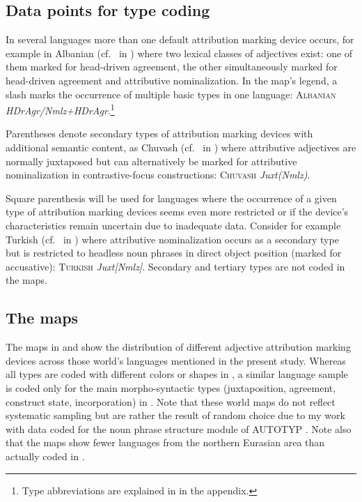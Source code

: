 \subsection[Type coding]{Data points for type coding}
In several languages more than one default attribution marking device occurs, for example in Albanian (cf.~ in ) where two lexical classes of adjectives exist: one of them marked for head-driven agreement, the other simultaneously marked for head-driven agreement and attributive nominalization. In the map's legend, a slash marks the occurrence of multiple basic types in one language: \textsc{Albanian} \textit{HDrAgr/Nmlz+HDrAgr}.\footnote{Type abbreviations are explained in  in the appendix.}

Parentheses denote secondary types of attribution marking devices with additional semantic content, as Chuvash (cf.~ in ) where attributive adjectives are normally juxtaposed but can alternatively be marked for attributive nominalization in contrastive-focus constructions: \textsc{Chuvash} \textit{Juxt(Nmlz)}.

Square parenthesis will be used for languages where the occurrence of a given type of attribution marking devices seems even more restricted or if the device's characteristics remain uncertain due to inadequate data. Consider for example Turkish (cf.~ in ) where attributive nominalization occurs as a secondary type but is restricted to headless noun phrases in direct object position (marked for accusative): \textsc{Turkish} \textit{Juxt[Nmlz]}. 
Secondary and tertiary types are not coded in the maps. 

\subsection{The maps}
The maps in  and  show the distribution of different adjective attribution marking devices across those world's languages mentioned in the present study. Whereas all types are coded with different colors or shapes in , a similar language sample is coded only for the main morpho-syntactic types (juxtaposition, agreement, construct state, incorporation) in . Note that these world maps do not reflect systematic sampling but are rather the result of random choice due to my work with data coded for the noun phrase structure module of AUTOTYP \citep{AUTOTYP-NP}. Note also that the maps show fewer languages from the northern Eurasian area than actually coded in .

